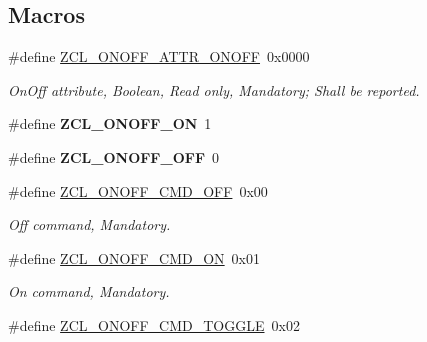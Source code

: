 \subsection*{Macros}
\begin{DoxyCompactItemize}
\item 
\mbox{\label{group__zcl__onoff_gacead5607fb8cc864c55906e350a64bd1}} 
\#define \hyperlink{group__zcl__onoff_gacead5607fb8cc864c55906e350a64bd1}{Z\+C\+L\+\_\+\+O\+N\+O\+F\+F\+\_\+\+A\+T\+T\+R\+\_\+\+O\+N\+O\+FF}~0x0000
\begin{DoxyCompactList}\small\item\em On\+Off attribute, Boolean, Read only, Mandatory; Shall be reported. \end{DoxyCompactList}\item 
\mbox{\label{group__zcl__onoff_gaecb7161f8e345f46eb152712ad013076}} 
\#define {\bfseries Z\+C\+L\+\_\+\+O\+N\+O\+F\+F\+\_\+\+ON}~1
\item 
\mbox{\label{group__zcl__onoff_gafb283aacc97d39a5dce2e5f43861794c}} 
\#define {\bfseries Z\+C\+L\+\_\+\+O\+N\+O\+F\+F\+\_\+\+O\+FF}~0
\item 
\mbox{\label{group__zcl__onoff_gae399574a77084fc410cbd12cd30ff10d}} 
\#define \hyperlink{group__zcl__onoff_gae399574a77084fc410cbd12cd30ff10d}{Z\+C\+L\+\_\+\+O\+N\+O\+F\+F\+\_\+\+C\+M\+D\+\_\+\+O\+FF}~0x00
\begin{DoxyCompactList}\small\item\em Off command, Mandatory. \end{DoxyCompactList}\item 
\mbox{\label{group__zcl__onoff_gab3ebd17876bb8a4ac892665a7093cd22}} 
\#define \hyperlink{group__zcl__onoff_gab3ebd17876bb8a4ac892665a7093cd22}{Z\+C\+L\+\_\+\+O\+N\+O\+F\+F\+\_\+\+C\+M\+D\+\_\+\+ON}~0x01
\begin{DoxyCompactList}\small\item\em On command, Mandatory. \end{DoxyCompactList}\item 
\mbox{\label{group__zcl__onoff_ga03727593ce0b9deea2e9c6c24077a27c}} 
\#define \hyperlink{group__zcl__onoff_ga03727593ce0b9deea2e9c6c24077a27c}{Z\+C\+L\+\_\+\+O\+N\+O\+F\+F\+\_\+\+C\+M\+D\+\_\+\+T\+O\+G\+G\+LE}~0x02

\end{DoxyCompactItemize}
